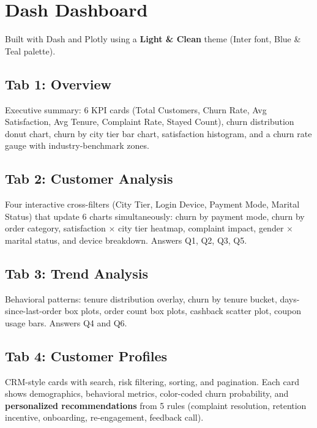 \documentclass[11pt,a4paper]{article}
\begin{document}
\section{Dash Dashboard}

Built with Dash and Plotly using a \textbf{Light \& Clean} theme (Inter font, Blue \& Teal palette).

\subsection{Tab 1: Overview}

Executive summary: 6 KPI cards (Total Customers, Churn Rate, Avg Satisfaction, Avg Tenure, Complaint Rate, Stayed Count), churn distribution donut chart, churn by city tier bar chart, satisfaction histogram, and a churn rate gauge with industry-benchmark zones.

\subsection{Tab 2: Customer Analysis}

Four interactive cross-filters (City Tier, Login Device, Payment Mode, Marital Status) that update 6 charts simultaneously: churn by payment mode, churn by order category, satisfaction $\times$ city tier heatmap, complaint impact, gender $\times$ marital status, and device breakdown. Answers Q1, Q2, Q3, Q5.

\subsection{Tab 3: Trend Analysis}

Behavioral patterns: tenure distribution overlay, churn by tenure bucket, days-since-last-order box plots, order count box plots, cashback scatter plot, coupon usage bars. Answers Q4 and Q6.

\subsection{Tab 4: Customer Profiles}

CRM-style cards with search, risk filtering, sorting, and pagination. Each card shows demographics, behavioral metrics, color-coded churn probability, and \textbf{personalized recommendations} from 5 rules (complaint resolution, retention incentive, onboarding, re-engagement, feedback call).
\end{document}
